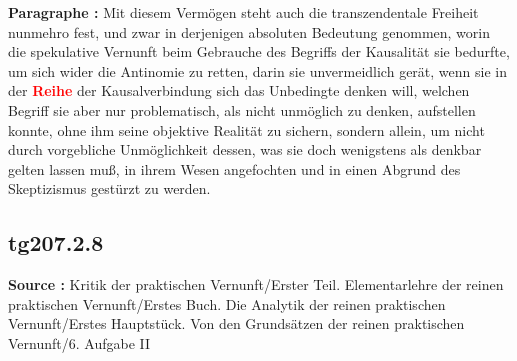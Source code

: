 \documentclass[a4paper,12pt,twoside]{book}
\newcommand{\match}[1]{\textcolor{red}{\textbf{#1}}}
\begin{document}
	\noindent\textbf{Paragraphe : }Mit diesem Vermögen steht auch die transzendentale Freiheit nunmehro fest, und zwar in derjenigen absoluten Bedeutung genommen, worin die spekulative Vernunft beim Gebrauche des Begriffs der Kausalität sie bedurfte, um sich wider die Antinomie zu retten, darin sie unvermeidlich gerät, wenn sie in der \match{Reihe} der Kausalverbindung sich das Unbedingte denken will, welchen Begriff sie aber nur problematisch, als nicht unmöglich zu denken, aufstellen konnte, ohne ihm seine objektive Realität zu sichern, sondern allein, um nicht durch vorgebliche Unmöglichkeit dessen, was sie doch wenigstens als denkbar gelten lassen muß, in ihrem Wesen angefochten und in einen Abgrund des Skeptizismus gestürzt zu werden. 
	
	\subsection*{tg207.2.8} 
	\textbf{Source : }Kritik der praktischen Vernunft/Erster Teil. Elementarlehre der reinen praktischen Vernunft/Erstes Buch. Die Analytik der reinen praktischen Vernunft/Erstes Hauptstück. Von den Grundsätzen der reinen praktischen Vernunft/6. Aufgabe II\\  
	
\end{document}
